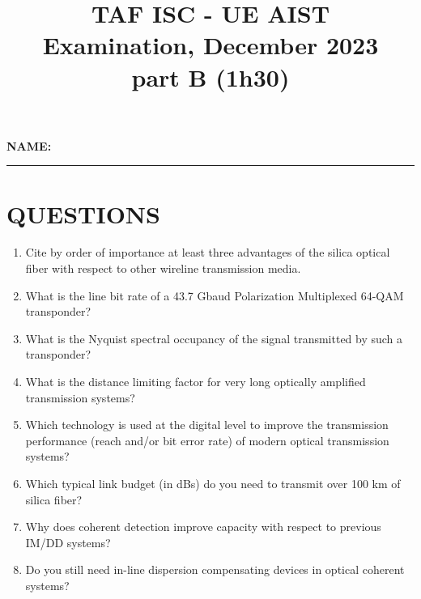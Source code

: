 \documentclass[a4paper,11pt]{article}
\title{\textbf{TAF ISC - UE AIST\\Examination, December 2023\\part B (1h30)}}
\date{}
\begin{document}
\maketitle

\textbf{NAME:} \rule{8cm}{0.4pt}

\section*{QUESTIONS}

\begin{enumerate}
    \item Cite by order of importance at least three advantages of the silica optical fiber with respect to other wireline transmission media.
    
    \vspace{2cm}
    
    \item What is the line bit rate of a 43.7 Gbaud Polarization Multiplexed 64-QAM transponder?
    
    \vspace{2cm}
    
    \item What is the Nyquist spectral occupancy of the signal transmitted by such a transponder?
    
    \vspace{2cm}
    
    \item What is the distance limiting factor for very long optically amplified transmission systems?
    
    \vspace{2cm}
    
    \item Which technology is used at the digital level to improve the transmission performance (reach and/or bit error rate) of modern optical transmission systems?
    
    \vspace{2cm}
    
    \item Which typical link budget (in dBs) do you need to transmit over 100 km of silica fiber?
    
    \vspace{2cm}
    
    \item Why does coherent detection improve capacity with respect to previous IM/DD systems?
    
    \vspace{2cm}
    
    \item Do you still need in-line dispersion compensating devices in optical coherent systems?
    
    \vspace{2cm}
\end{enumerate}
\end{document}
